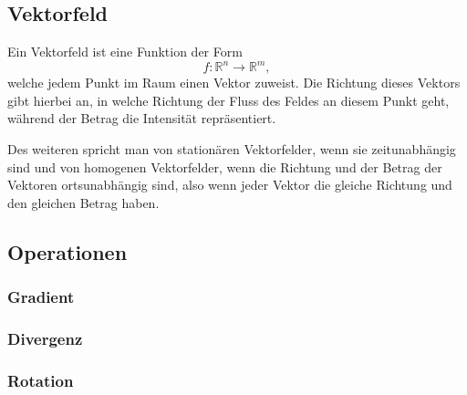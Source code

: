 \subsection{Vektorfeld\label{maxwell:vektorfeld}}

Ein Vektorfeld ist eine Funktion der Form \[ f: \mathbb{R}^n \rightarrow \mathbb{R}^m, \] welche jedem Punkt im Raum einen Vektor zuweist. 
Die Richtung dieses Vektors gibt hierbei an, in welche Richtung der Fluss des Feldes an diesem Punkt geht, während der Betrag die Intensität repräsentiert.



Des weiteren spricht man von stationären Vektorfelder, wenn sie zeitunabhängig sind und von homogenen Vektorfelder, wenn die Richtung und der Betrag der Vektoren ortsunabhängig sind, also wenn jeder Vektor die gleiche Richtung und den gleichen Betrag haben.

\subsection{Operationen}

\subsubsection*{Gradient}

\subsubsection*{Divergenz}

\subsubsection*{Rotation}

